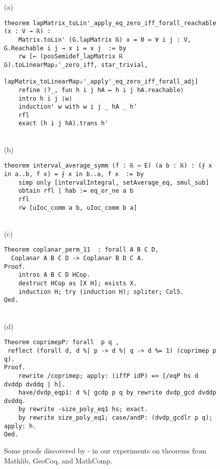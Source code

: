 \begin{figure*}
\begin{mdframed}[roundcorner=10pt]
(a)
\begin{minipage}{0.9\textwidth}
\begin{lstlisting}
theorem lapMatrix_toLin'_apply_eq_zero_iff_forall_reachable (x : V → ℝ) :
    Matrix.toLin' (G.lapMatrix ℝ) x = 0 ↔ ∀ i j : V, G.Reachable i j → x i = x j  := by
    rw [← (posSemidef_lapMatrix ℝ G).toLinearMap₂'_zero_iff, star_trivial,
        lapMatrix_toLinearMap₂'_apply'_eq_zero_iff_forall_adj]
    refine ⟨?_, fun h i j hA ↦ h i j hA.reachable⟩
    intro h i j ⟨w⟩
    induction' w with w i j _ hA _ h'
    rfl
    exact (h i j hA).trans h'
\end{lstlisting}
\end{minipage}
\\(b)
\begin{minipage}{0.9\textwidth}
\begin{lstlisting}
theorem interval_average_symm (f : ℝ → E) (a b : ℝ) : (⨍ x in a..b, f x) = ⨍ x in b..a, f x  := by
    simp only [intervalIntegral, setAverage_eq, smul_sub]
    obtain rfl | hab := eq_or_ne a b
    rfl
    rw [uIoc_comm a b, uIoc_comm b a]
\end{lstlisting}
\end{minipage}
\\(c)
\begin{minipage}{0.9\textwidth}
\begin{verbatim}
Theorem coplanar_perm_11  : forall A B C D,
  Coplanar A B C D -> Coplanar B D C A.
Proof.
    intros A B C D HCop.
    destruct HCop as [X H]; exists X.
    induction H; try (induction H); spliter; Col5.
Qed.
\end{verbatim}
\end{minipage}
\\(d)
\begin{minipage}{0.9\textwidth}
\begin{verbatim}
Theorem coprimepP: forall  p q , 
 reflect (forall d, d %| p -> d %| q -> d %= 1) (coprimep p q).
Proof.
    rewrite /coprimep; apply: (iffP idP) => [/eqP hs d dvddp dvddq | h].
    have/dvdp_eqp1: d %| gcdp p q by rewrite dvdp_gcd dvddp dvddq.
    by rewrite -size_poly_eq1 hs; exact.
    by rewrite size_poly_eq1; case/andP: (dvdp_gcdlr p q); apply: h.
Qed.
\end{verbatim}
\end{minipage}
\end{mdframed}
\vspace{-0.1in}
\caption{Some proofs discovered by \proofwala-\multi\; in our experiments on theorems from Mathlib, GeoCoq, and MathComp.}
\label{fig:app-example-lean}
\end{figure*}
